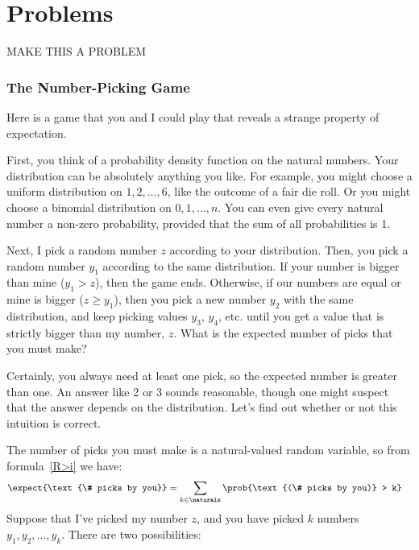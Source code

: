 

\section{Problems}

\begin{editingnotes}

MAKE THIS A PROBLEM

\subsubsection{The Number-Picking Game}

Here is a game that you and I could play that reveals a strange
property of expectation.

First, you think of a probability density function on the natural
numbers.  Your distribution can be absolutely anything you like.  For
example, you might choose a uniform distribution on $1, 2, \dots, 6$,
like the outcome of a fair die roll.  Or you might choose a binomial
distribution on $0, 1, \dots, n$.  You can even give every natural
number a non-zero probability, provided that the sum of all
probabilities is 1.

Next, I pick a random number $z$ according to your distribution.
Then, you pick a random number $y_1$ according to the same
distribution.  If your number is bigger than mine ($y_1 > z$), then
the game ends.  Otherwise, if our numbers are equal or mine is bigger
($z \geq y_1$), then you pick a new number $y_2$ with the same
distribution, and keep picking values $y_3$, $y_4$, etc. until you get
a value that is strictly bigger than my number, $z$.  What is the
expected number of picks that you must make?

Certainly, you always need at least one pick, so the expected number
is greater than one.  An answer like 2 or 3 sounds reasonable, though
one might suspect that the answer depends on the distribution.  Let's
find out whether or not this intuition is correct.

The number of picks you must make is a natural-valued random variable, so
from formula~\eqref{R>i} we have:
\begin{align}
\expect{\text{\# picks by you}}
    & = \sum_{k \in \naturals} \prob{\text{(\# picks by you)} > k} \label{eqn:1}
\end{align}
Suppose that I've picked my number $z$, and you have picked $k$
numbers $y_1, y_2, \dots, y_k$.  There are two possibilities:
%
\begin{itemize}


\end{itemize}
\end{editingnotes}
